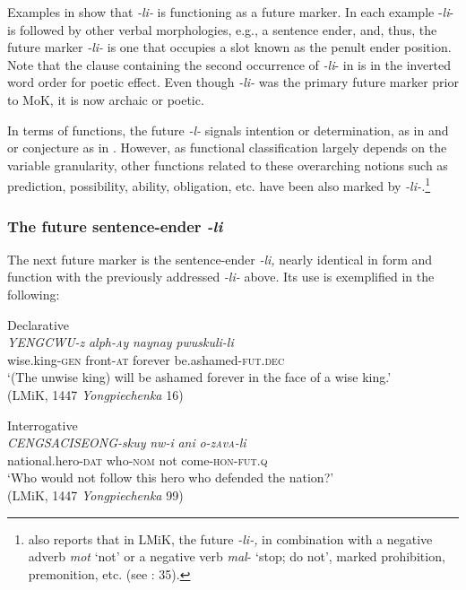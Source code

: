 \documentclass[output=paper,colorlinks,citecolor=brown]{langscibook}
\begin{document}
\z

Examples in  show that \textit{-li-} is functioning as a future marker. In each example -\textit{li}- is followed by other verbal morphologies, e.g., a sentence ender, and, thus, the future marker \textit{-li-} is one that occupies a slot known as the penult ender position. Note that the clause containing the second occurrence of \textit{-li}- in  is in the inverted word order for poetic effect. Even though \textit{-li-} was the primary future marker prior to MoK, it is now archaic or poetic. 

In terms of functions, the future \textit{-l-} signals intention or determination, as in  and  or conjecture as in . However, as functional classification largely depends on the variable granularity, other functions related to these overarching notions such as prediction, possibility, ability, obligation, etc. have been also marked by \textit{-li-.}\footnote{\citet[32--35]{Lee1997} also reports that in LMiK, the future \textit{-li-,} in combination with a negative adverb \textit{mot} ‘not’ or a negative verb \textit{mal}- ‘stop; do not’, marked prohibition, premonition, etc. (see \cite{Lee1997}: 35). }

\subsubsection{{The future sentence-ender \textit{-li}}}
The next future marker is the sentence-ender \textit{-li,} nearly identical in form and function with the previously addressed \textit{-li-} above. Its use is exemplified in the following: 

\ea \label{ex:rhee:4}

    \ea Declarative\\
    \gll \textit{YENGCWU-z} \textit{alph-\textsc{a}y} \textit{naynay} \textit{pwuskuli-li}\\
         wise.king-\textsc{gen} front-\textsc{at} forever be.ashamed-\textsc{fut.dec}\\
    \glt ‘(The unwise king) will be ashamed forever in the face of a wise king.’\\
    \hfill (LMiK, 1447 \textit{Yongpiechenka} 16)

    \ex Interrogative\\
    \gll \textit{CENGSACISEONG-skuy} \textit{nw-i} \textit{ani} \textit{o-z\textsc{a}v\textsc{a}-li}\\
         national.hero-\textsc{dat} who-\textsc{nom} not come-\textsc{hon-fut.q}\\
    \glt ‘Who would not follow this hero who defended the nation?’\\
    \hfill (LMiK, 1447 \textit{Yongpiechenka} 99)
    \z
\z
\end{document}
